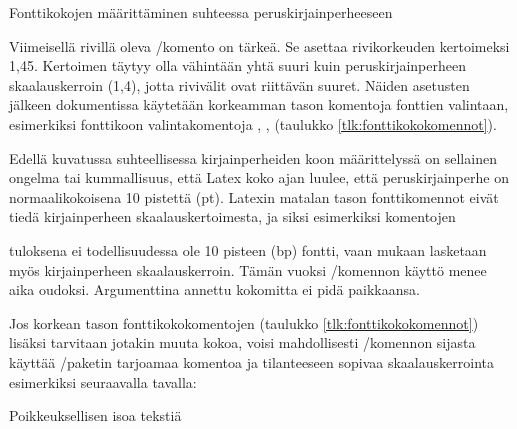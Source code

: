 \begin{esimerkki*}
\caption{Fonttikokojen määrittäminen suhteessa peruskirjainperheeseen}
\label{esim:fontti_suhteellinen}
\end{esimerkki*}

Viimeisellä rivillä oleva \-/komento on tärkeä.
Se asettaa rivikorkeuden kertoimeksi 1,45. Kertoimen täytyy olla
vähintään yhtä suuri kuin peruskirjainperheen skaalauskerroin (1,4),
jotta rivivälit ovat riittävän suuret. Näiden asetusten jälkeen
dokumentissa käytetään korkeamman tason komentoja fonttien valintaan,
esimerkiksi fonttikoon valintakomentoja ,
,  (taulukko
\ref{tlk:fonttikokokomennot}).

Edellä kuvatussa suhteellisessa kirjainperheiden koon määrittelyssä on
sellainen ongelma tai kummallisuus, että Latex koko ajan luulee, että
peruskirjainperhe on normaalikokoisena 10 pistettä (pt). Latexin matalan
tason fonttikomennot eivät tiedä kirjainperheen skaalauskertoimesta, ja
siksi esimerkiksi komentojen

\begin{koodilohkosis}
  \fontsize{10bp}{12bp} \selectfont
\end{koodilohkosis}

tuloksena ei todellisuudessa ole 10 pisteen (bp) fontti, vaan mukaan
lasketaan myös kirjainperheen skaalauskerroin. Tämän vuoksi \-/komennon käyttö menee aika oudoksi. Argumenttina annettu
kokomitta ei pidä paikkaansa.

Jos korkean tason font\-ti\-koko\-komen\-to\-jen (taulukko
\ref{tlk:fonttikokokomennot}) lisäksi tarvitaan jotakin muuta kokoa,
voisi mahdollisesti \-/komennon sijasta käyttää
\-/paketin tarjoamaa komentoa ja tilanteeseen sopivaa
skaalauskerrointa esimerkiksi seuraavalla tavalla:

\begin{koodilohkosis}
  { Poikkeuksellisen isoa tekstiä}
\end{koodilohkosis}

